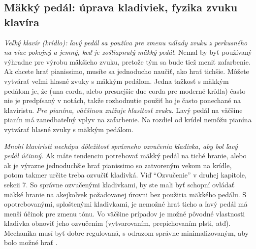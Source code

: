 \subsection{Mäkký pedál: úprava kladiviek, fyzika zvuku klavíra}
\emph{Veľký klavír (krídlo): ľavý pedál sa používa pre zmenu nálady zvuku z perkusného na viac pokojný a jemný, keď je zošliapnutý mäkký pedál.} Nemal by byť používaný výhradne pre výrobu mäkšieho zvuku, pretože tým sa bude tiež meniť zafarbenie. Ak chcete hrať pianissimo, musíte sa jednoducho naučiť, ako hrať tichšie. Môžete vytvárať veľmi hlasné zvuky s mäkkým pedálom. Jedna ťažkosť s mäkkým pedálom je, že (una corda, alebo presnejšie due corda pre moderné krídla) často nie je predpísaný v notách, takže rozhodnutie použiť ho je často ponechané na klaviristu. \emph{Pre pianína, väčšinou znižuje hlasitosť zvuku.} Ľavý pedál na väčšine pianín má zanedbateľný vplyv na zafarbenie. Na rozdiel od krídel nemôžu pianína vytvárať hlasné zvuky s mäkkým pedálom.

\emph{Mnohí klaviristi nechápu dôležitosť správneho ozvučenia kladivka, aby bol ľavý pedál účinný.} Ak máte tendenciu potrebovať mäkký pedál na tiché hranie, alebo ak je výrazne jednoduchšie hrať pianissimo so zatvoreným vekom na krídle, potom takmer určite treba ozvučiť kladivká. Viď “Ozvučenie” v druhej kapitole, sekcii 7. So správne ozvučenými kladivkami, by ste mali byť schopní ovládať mäkké hranie na akejkoľvek požadovanej úrovni bez použitia mäkkého pedálu. S opotrebovanými, sploštenými kladivkami, je nemožné hrať ticho a ľavý pedál má menší účinok pre zmenu tónu. Vo väčšine prípadov je možné pôvodné vlastnosti kladivka obnoviť jeho ozvučením (vytvarovaním, prepichovaním plsti, atď). Mechanika musí byť dobre regulovaná, s odrazom správne minimalizovaným, aby bolo možné hrať .

